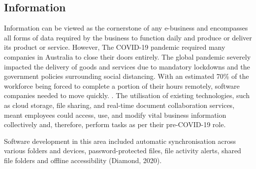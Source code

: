 \documentclass[a0,portrait]{a0poster}
\begin{document}
\begin{multicols}{2}
\subsection*{Information}
Information can be viewed as the cornerstone of any e-business and encompasses all forms of data required by the business to function daily and produce or deliver its product or service. However, The COVID-19 pandemic required many companies in Australia to close their doors entirely. The global pandemic severely impacted the delivery of goods and services due to mandatory lockdowns and the government policies surrounding social distancing. With an estimated 70\% of the workforce being forced to complete a portion of their hours remotely, software companies needed to move quickly. \cite{diamond}. The utilisation of existing technologies, such as cloud storage, file sharing, and real-time document collaboration services, meant employees could access, use, and modify vital business information collectively and, therefore, perform tasks as per their pre-COVID-19 role. \par 
Software development in this area included automatic synchronisation across various folders and devices, password-protected files, file activity alerts, shared file folders and offline accessibility (Diamond, 2020). \par


\end{multicols}
\end{document}
